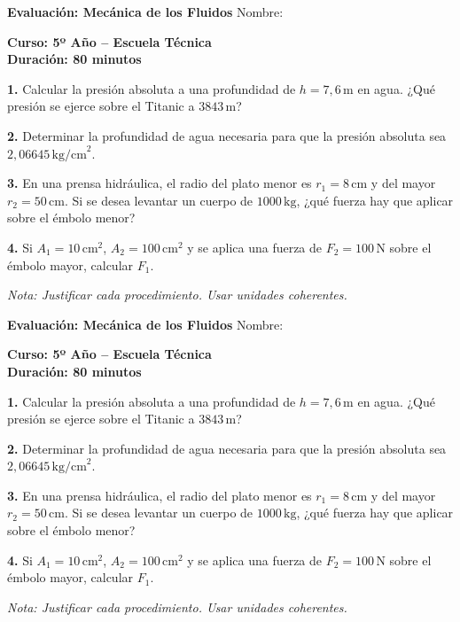 \documentclass[10pt]{article}
\begin{document}
\begin{minipage}[t][0.23\textheight][t]{0.48\textwidth}
\textbf{Evaluación: Mecánica de los Fluidos} \hfill Nombre: \hrulefill

\vspace{1mm}
\textbf{Curso: 5º Año – Escuela Técnica} \\
\textbf{Duración: 80 minutos}

\vspace{2mm}
\textbf{1.} Calcular la presión absoluta a una profundidad de $h=7,6\,\text{m}$ en agua. ¿Qué presión se ejerce sobre el Titanic a $3843\,\text{m}$?

\vspace{2mm}
\textbf{2.} Determinar la profundidad de agua necesaria para que la presión absoluta sea $2{,}06645\,\text{kg/cm}^2$.

\vspace{2mm}
\textbf{3.} En una prensa hidráulica, el radio del plato menor es $r_1 = 8\,\text{cm}$ y del mayor $r_2 = 50\,\text{cm}$. Si se desea levantar un cuerpo de $1000\,\text{kg}$, ¿qué fuerza hay que aplicar sobre el émbolo menor?

\vspace{2mm}
\textbf{4.} Si $A_1 = 10\,\text{cm}^2$, $A_2 = 100\,\text{cm}^2$ y se aplica una fuerza de $F_2 = 100\,\text{N}$ sobre el émbolo mayor, calcular $F_1$.

\vfill
\textit{Nota: Justificar cada procedimiento. Usar unidades coherentes.}
\end{minipage}
\hspace{0.04\textwidth}
\begin{minipage}[t][0.23\textheight][t]{0.48\textwidth}
\textbf{Evaluación: Mecánica de los Fluidos} \hfill Nombre: \hrulefill

\vspace{1mm}
\textbf{Curso: 5º Año – Escuela Técnica} \\
\textbf{Duración: 80 minutos}

\vspace{2mm}
\textbf{1.} Calcular la presión absoluta a una profundidad de $h=7,6\,\text{m}$ en agua. ¿Qué presión se ejerce sobre el Titanic a $3843\,\text{m}$?

\vspace{2mm}
\textbf{2.} Determinar la profundidad de agua necesaria para que la presión absoluta sea $2{,}06645\,\text{kg/cm}^2$.

\vspace{2mm}
\textbf{3.} En una prensa hidráulica, el radio del plato menor es $r_1 = 8\,\text{cm}$ y del mayor $r_2 = 50\,\text{cm}$. Si se desea levantar un cuerpo de $1000\,\text{kg}$, ¿qué fuerza hay que aplicar sobre el émbolo menor?

\vspace{2mm}
\textbf{4.} Si $A_1 = 10\,\text{cm}^2$, $A_2 = 100\,\text{cm}^2$ y se aplica una fuerza de $F_2 = 100\,\text{N}$ sobre el émbolo mayor, calcular $F_1$.

\vfill
\textit{Nota: Justificar cada procedimiento. Usar unidades coherentes.}
\end{minipage}
\end{document}

